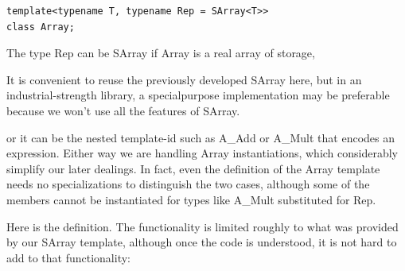 \begin{lstlisting}[style=styleCXX]
template<typename T, typename Rep = SArray<T>>
class Array;
\end{lstlisting}

The type Rep can be SArray if Array is a real array of storage,

\begin{tcolorbox}[colback=webgreen!5!white,colframe=webgreen!75!black]
\hspace*{0.75cm}It is convenient to reuse the previously developed SArray here, but in an industrial-strength library, a specialpurpose implementation may be preferable because we won’t use all the features of SArray.
\end{tcolorbox}

or it can be the nested template-id such as A\_Add or A\_Mult that encodes an expression. Either way we are handling Array instantiations, which considerably simplify our later dealings. In fact, even the definition of the Array template needs no specializations to distinguish the two cases, although some of the members cannot be instantiated for types like A\_Mult substituted for Rep.

Here is the definition. The functionality is limited roughly to what was provided by our SArray template, although once the code is understood, it is not hard to add to that functionality:

